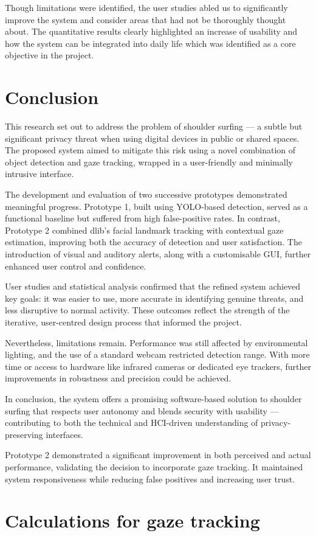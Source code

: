 \documentclass[12pt]{article}
\theoremstyle{plain}
\theoremstyle{definition}
\begin{document}
Though limitations were identified, the user studies abled us to significantly improve the system and consider areas that had not be thoroughly thought about. The quantitative results clearly highlighted an increase of usability and how the system can be integrated into daily life which was identified as a core objective in the project.

\section{Conclusion}
\label{conclusion}

This research set out to address the problem of shoulder surfing — a subtle but significant privacy threat when using digital devices in public or shared spaces. The proposed system aimed to mitigate this risk using a novel combination of object detection and gaze tracking, wrapped in a user-friendly and minimally intrusive interface.

The development and evaluation of two successive prototypes demonstrated meaningful progress. Prototype 1, built using YOLO-based detection, served as a functional baseline but suffered from high false-positive rates. In contrast, Prototype 2 combined dlib’s facial landmark tracking with contextual gaze estimation, improving both the accuracy of detection and user satisfaction. The introduction of visual and auditory alerts, along with a customisable GUI, further enhanced user control and confidence.

User studies and statistical analysis confirmed that the refined system achieved key goals: it was easier to use, more accurate in identifying genuine threats, and less disruptive to normal activity. These outcomes reflect the strength of the iterative, user-centred design process that informed the project.

Nevertheless, limitations remain. Performance was still affected by environmental lighting, and the use of a standard webcam restricted detection range. With more time or access to hardware like infrared cameras or dedicated eye trackers, further improvements in robustness and precision could be achieved.

In conclusion, the system offers a promising software-based solution to shoulder surfing that respects user autonomy and blends security with usability — contributing to both the technical and HCI-driven understanding of privacy-preserving interfaces.

Prototype 2 demonstrated a significant improvement in both perceived and actual performance, validating the decision to incorporate gaze tracking. It maintained system responsiveness while reducing false positives and increasing user trust.


\newpage
\printbibliography 

\clearpage\appendix

\section{Calculations for gaze tracking}
\label{app:gaze_calcs}


\end{document}
